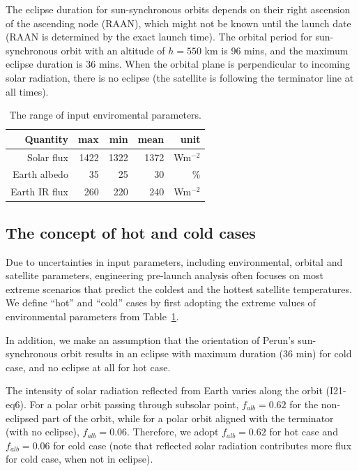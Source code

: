 \documentclass[]{aastex62}
\begin{document}
The eclipse duration for sun-synchronous orbits depends on their right ascension of the 
ascending node (RAAN), which might not be known until the launch date (RAAN is determined
by the exact launch time). The orbital period for sun-synchronous orbit with an altitude of 
$h=550$ km is 96 mins, and the maximum eclipse duration is 36 mins.  When the orbital 
plane is perpendicular to incoming solar radiation, there is no eclipse (the satellite is following 
the terminator line at all times). 


\begin{table}[t]
	\centering
	\caption{The range of input enviromental parameters. }
	\label{tab:inputsEnvParam}
	\begin{tabular}{r|r|r|r|r} %
		\hline
  	         Quantity & max    &   min   &  mean &  unit            \\
		\hline
              Solar flux   &  1422  &  1322  &  1372 & Wm$^{-2}$  \\
           Earth albedo  &    35    &    25    &     30  &   \%            \\ 
            Earth IR flux &  260    &   220   &    240 & Wm$^{-2}$   \\
 		\hline
	\end{tabular} 
\end{table}


\subsection{The concept of hot and cold cases} 

Due to uncertainties in input parameters, including environmental, orbital and satellite parameters,
engineering pre-launch analysis often focuses on most extreme scenarios that predict the coldest 
and the hottest satellite temperatures. We define ``hot'' and ``cold'' cases by first adopting 
the extreme values of environmental parameters from Table~\ref{tab:inputsEnvParam}. 

In addition, we make an assumption that the orientation of Perun's sun-synchronous orbit
results in an eclipse with maximum duration (36 min) for cold case, and no eclipse at all for 
hot case. 

The intensity of solar radiation reflected from Earth varies along the orbit (I21-eq6). For a polar 
orbit passing through subsolar point, $f_{alb}=0.62$ for the non-eclipsed part of the orbit, while 
for a polar orbit aligned with the terminator (with no eclipse), $f_{alb}=0.06$. Therefore, 
we adopt $f_{alb}=0.62$ for hot case and $f_{alb}=0.06$ for cold case (note that reflected solar 
radiation contributes more flux for cold case, when not in eclipse). 
 
\end{document}
